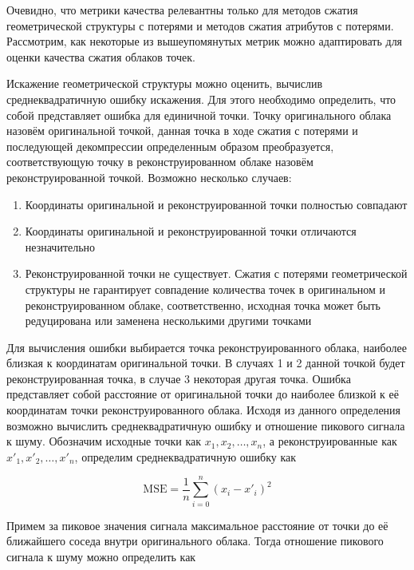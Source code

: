 Очевидно, что метрики качества релевантны только для методов сжатия
геометрической структуры с потерями и методов сжатия атрибутов с потерями.
Рассмотрим, как некоторые из вышеупомянутых метрик можно адаптировать для оценки
качества сжатия облаков точек.


Искажение геометрической структуры можно оценить, вычислив среднеквадратичную
ошибку искажения. Для этого необходимо определить, что собой представляет ошибка
для единичной точки. Точку оригинального облака назовём оригинальной точкой,
данная точка в ходе сжатия с потерями и последующей декомпрессии определенным
образом преобразуется, соответствующую точку в реконструированном облаке назовём
реконструированной точкой. Возможно несколько случаев:

\begin{enumerate}
    \item Координаты оригинальной и реконструированной точки полностью совпадают
    \item Координаты оригинальной и реконструированной точки отличаются
    незначительно
    \item Реконструированной точки не существует. Сжатия с потерями
    геометрической структуры не гарантирует совпадение количества точек в
    оригинальном и реконструированном облаке, соответственно, исходная точка
    может быть редуцирована или заменена несколькими другими точками
\end{enumerate}

Для вычисления ошибки выбирается точка реконструированного облака, наиболее
близкая к координатам оригинальной точки. В случаях 1 и 2 данной точкой будет
реконструированная точка, в случае 3 некоторая другая точка. Ошибка представляет
собой расстояние от оригинальной точки до наиболее близкой к её координатам
точки реконструированного облака. Исходя из данного определения возможно
вычислить среднеквадратичную ошибку и отношение пикового сигнала к шуму. Обозначим
исходные точки как $x_{1}, x_{2}, \dots, x_{n}$, а реконструированные как
$x'_{1}, x'_{2}, \dots, x'_{n}$, определим среднеквадратичную ошибку как

\begin{equation} \label{eq:cloud_mse}
    \text{MSE} = \frac{1}{n} \sum_{i = 0}^{n} \left( x_{i} - x'_{i} \right)^{2}
\end{equation}

Примем за пиковое значения сигнала максимальное расстояние от точки до её
ближайшего соседа внутри оригинального облака. Тогда отношение пикового сигнала
к шуму можно определить как

